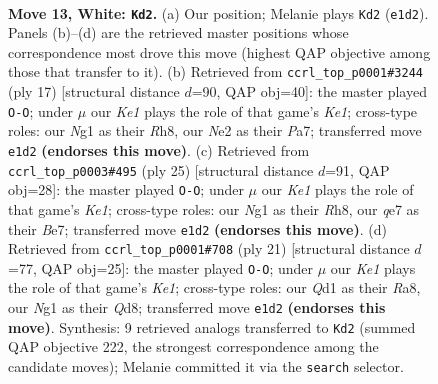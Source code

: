 \documentclass[11pt]{article}
\begin{document}
\clearpage

\begin{figure}[p]\centering
\begin{subfigure}{0.46\textwidth}\centering
\resizebox{\linewidth}{!}{%
\newchessgame
\chessboard[
  setfen={rnb2rk1/2pnq1pp/pp2p3/3pPp2/3P1P1P/8/PPP1N1P1/1R1QKBNR w - f6 0 13},
  showmover=false,
  pgfstyle=straightmove, color=movearrow, markmove={e1-d2}
]}
\caption{}
\end{subfigure}\hfill
\begin{subfigure}{0.46\textwidth}\centering
\resizebox{\linewidth}{!}{%
\newchessgame
\chessboard[
  setfen={r1bqk2r/pp1n1ppp/2p2n2/4p3/P1p5/R4NP1/1PQPPPBP/2B2RK1 b kq - 0 9},
  showmover=false,
  pgfstyle=straightmove, color=movearrow, markmove={e8-g8}
]}
\caption{}
\end{subfigure}
\\[4pt]
\begin{subfigure}{0.46\textwidth}\centering
\resizebox{\linewidth}{!}{%
\newchessgame
\chessboard[
  setfen={r2qk2r/1p1nbppp/2p1pn2/p7/P2PPB2/2NQ1N2/1P3PPP/R2R2K1 b kq - 3 13},
  showmover=false,
  pgfstyle=straightmove, color=movearrow, markmove={e8-g8}
]}
\caption{}
\end{subfigure}\hfill
\begin{subfigure}{0.46\textwidth}\centering
\resizebox{\linewidth}{!}{%
\newchessgame
\chessboard[
  setfen={r2qk2r/1ppnbppp/p2p2n1/3Pp3/P3P3/2P2N2/1P1N1PPP/R1BQ1RK1 b kq - 0 11},
  showmover=false,
  pgfstyle=straightmove, color=movearrow, markmove={e8-g8}
]}
\caption{}
\end{subfigure}
\caption{\textbf{Move 13, White: \texttt{Kd2}.} (a) Our position; Melanie plays \texttt{Kd2} (\texttt{e1d2}). Panels (b)--(d) are the retrieved master positions whose correspondence most drove this move (highest QAP objective among those that transfer to it). (b) Retrieved from \texttt{ccrl\_top\_p0001\#3244} (ply 17) [structural distance $d$=90, QAP obj=40]: the master played \texttt{O-O}; under $\mu$ our \emph{Ke1} plays the role of that game's \emph{Ke1}; cross-type roles: our \emph{N}g1 as their \emph{R}h8, our \emph{N}e2 as their \emph{P}a7; transferred move \texttt{e1d2} \textbf{(endorses this move)}. (c) Retrieved from \texttt{ccrl\_top\_p0003\#495} (ply 25) [structural distance $d$=91, QAP obj=28]: the master played \texttt{O-O}; under $\mu$ our \emph{Ke1} plays the role of that game's \emph{Ke1}; cross-type roles: our \emph{N}g1 as their \emph{R}h8, our \emph{q}e7 as their \emph{B}e7; transferred move \texttt{e1d2} \textbf{(endorses this move)}. (d) Retrieved from \texttt{ccrl\_top\_p0001\#708} (ply 21) [structural distance $d$=77, QAP obj=25]: the master played \texttt{O-O}; under $\mu$ our \emph{Ke1} plays the role of that game's \emph{Ke1}; cross-type roles: our \emph{Q}d1 as their \emph{R}a8, our \emph{N}g1 as their \emph{Q}d8; transferred move \texttt{e1d2} \textbf{(endorses this move)}. Synthesis: 9 retrieved analogs transferred to \texttt{Kd2} (summed QAP objective 222, the strongest correspondence among the candidate moves); Melanie committed it via the \texttt{search} selector.}
\label{fig:thought-m24}
\end{figure}
\end{document}

